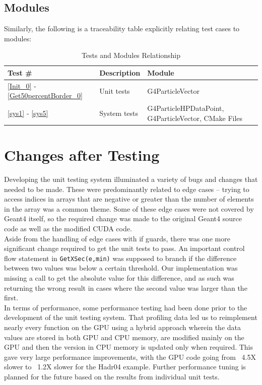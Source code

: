 \documentclass[12pt]{article}
\begin{document}
\subsection{Modules}
Similarly, the following is a traceability table explicitly relating test cases to modules:\\

\begin{center}
\begin{longtable}{>{\raggedright\arraybackslash}p{}>{\raggedright\arraybackslash}p{}>{\raggedright\arraybackslash}p{}}
\caption{Tests and Modules Relationship}\label{Table_TestsAndModules}
\\\toprule
\bf Test \#  & \bf Description & \bf Module\\\midrule
\ref{Init_0} - \ref{Get50percentBorder_0} & Unit tests & G4ParticleVector\\
\ref{sys1} - \ref{sys5} & System tests & G4ParticleHPDataPoint, G4ParticleVector, CMake Files\\
\bottomrule
\end{longtable}
\end{center}

\section{Changes after Testing}\label{Changes after Testing}
Developing the unit testing system illuminated a variety of bugs and changes that needed to be made. These were predominantly related to edge cases -- trying to access indices in arrays that are negative or greater than the number of elements in the array was a common theme. Some of these edge cases were not covered by Geant4 itself, so the required change was made to the original Geant4 source code as well as the modified CUDA code.\\

Aside from the handling of edge cases with if guards, there was one more significant change required to get the unit tests to pass. An important control flow statement in \texttt{GetXSec(e,min)} was supposed to branch if the difference between two values was below a certain threshold. Our implementation was missing a call to get the absolute value for this difference, and as such was returning the wrong result in cases where the second value was larger than the first.\\

In terms of performance, some performance testing had been done prior to the development of the unit testing system. That profiling data led us to reimplement nearly every function on the GPU using a hybrid approach wherein the data values are stored in both GPU and CPU memory, are modified mainly on the GPU and then the version in CPU memory is updated only when required. This gave very large performance improvements, with the GPU code going from ~4.5X slower to ~1.2X slower for the Hadr04 example. Further performance tuning is planned for the future based on the results from individual unit tests.
\end{document}
